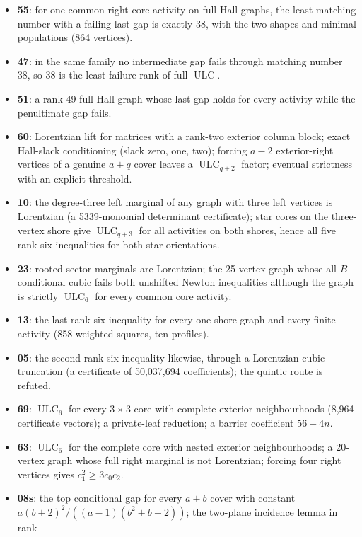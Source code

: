 \documentclass[11pt,a4paper]{article}
\theoremstyle{remark}\newtheorem{remark}[theorem]{Remark}
\newcommand{\ULC}{\operatorname{ULC}}      %
\begin{document}
\begin{itemize}
  transfer example.
\item \textbf{55}: for one common right-core activity on full Hall graphs, the
  least matching number with a failing last gap is exactly 38, with the two
  shapes and minimal populations (864 vertices).
\item \textbf{47}: in the same family no intermediate gap fails through
  matching number 38, so 38 is the least failure rank of full $\ULC$.
\item \textbf{51}: a rank-49 full Hall graph whose last gap holds for every
  activity while the penultimate gap fails.
\item \textbf{60}: Lorentzian lift for matrices with a rank-two exterior
  column block; exact Hall-slack conditioning (slack zero, one, two); forcing
  $a-2$ exterior-right vertices of a genuine $a+q$ cover leaves a
  $\ULC_{q+2}$ factor; eventual strictness with an explicit threshold.
\item \textbf{10}: the degree-three left marginal of any graph with three left
  vertices is Lorentzian (a 5339-monomial determinant certificate); star cores
  on the three-vertex shore give $\ULC_{q+3}$ for all activities on both
  shores, hence all five rank-six inequalities for both star orientations.
\item \textbf{23}: rooted sector marginals are Lorentzian; the 25-vertex graph
  whose all-$B$ conditional cubic fails both unshifted Newton inequalities
  although the graph is strictly $\ULC_6$ for every common core activity.
\item \textbf{13}: the last rank-six inequality for every one-shore graph and
  every finite activity (858 weighted squares, ten profiles).
\item \textbf{05}: the second rank-six inequality likewise, through a
  Lorentzian cubic truncation (a certificate of 50,037,694 coefficients); the
  quintic route is refuted.
\item \textbf{69}: $\ULC_6$ for every $3\times3$ core with complete exterior
  neighbourhoods (8,964 certificate vectors); a private-leaf reduction; a
  barrier coefficient $56-4n$.
\item \textbf{63}: $\ULC_6$ for the complete core with nested exterior
  neighbourhoods; a 20-vertex graph whose full right marginal is not
  Lorentzian; forcing four right vertices gives $c_1^2\ge3c_0c_2$.
\item \textbf{08s}: the top conditional gap for every $a+b$ cover with
  constant $a(b+2)^2/((a-1)(b^2+b+2))$; the two-plane incidence lemma in rank

\end{itemize}
\end{document}
